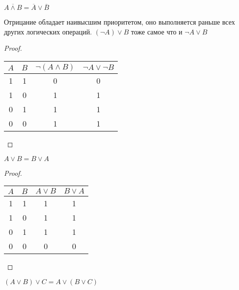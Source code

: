 \begin{theorem} \label{thm:1.2.4}
	$\overline{A \land B} = \overline{A} \lor \overline{B}$
\end{theorem}

\begin{remark}
	Отрицание обладает наивысшим приоритетом, оно выполняется раньше всех других логических операций. $(\neg A) \lor B$ тоже самое что и $\neg A \lor B$
\end{remark}

\begin{proof}
	\hfill \break \break
	\begin{center}
		\begin{tabular}{ |c|c|c|c| } 
			\hline
			$A$ & $B$ & $\neg (A \land B)$ & $\neg A \lor \neg B$ \\
			\hline 
			1 & 1 & 0 & 0 \\ 
			1 & 0 & 1 & 1 \\
			0 & 1 & 1 & 1 \\ 
			0 & 0 & 1 & 1 \\  
			\hline
		\end{tabular}
	\end{center}
\end{proof}

\newpage

\begin{theorem}
	$A \lor B = B \lor A$
\end{theorem}

\begin{proof}
	\hfill \break \break
	\begin{center}
		\begin{tabular}{ |c|c|c|c| } 
			\hline
			$A$ & $B$ & $A \lor B $ & $B \lor A$ \\
			\hline 
			1 & 1 & 1 & 1 \\ 
			1 & 0 & 1 & 1 \\
			0 & 1 & 1 & 1 \\ 
			0 & 0 & 0 & 0 \\  
			\hline
		\end{tabular}
	\end{center}
\end{proof}

\begin{theorem}
	$(A \lor B) \lor C = A \lor (B \lor C)$
\end{theorem}

